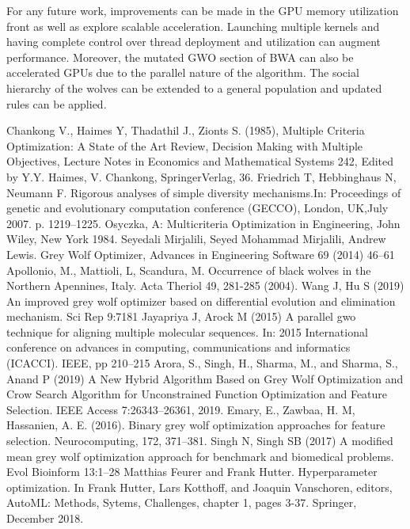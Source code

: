 \documentclass[conference]{IEEEtran}
\begin{document}
For any future work, improvements can be made in the GPU memory utilization front as well as explore scalable acceleration. Launching multiple kernels and having complete control over thread deployment and utilization can augment performance. Moreover, the mutated GWO section of BWA can also be accelerated GPUs due to the parallel nature of the algorithm. The social hierarchy of the wolves can be extended to a general population and updated rules can be applied. 

% 
\begin{thebibliography}{00}
 Chankong V., Haimes Y, Thadathil J., Zionts S. (1985), Multiple Criteria Optimization: A State of the Art Review, Decision Making with Multiple Objectives, Lecture Notes in Economics and Mathematical Systems 242, Edited by Y.Y. Haimes, V. Chankong, SpringerVerlag, 36.
Friedrich T, Hebbinghaus N, Neumann F. Rigorous analyses of simple diversity mechanisms.In: Proceedings of genetic and evolutionary computation conference (GECCO), London, UK,July 2007. p. 1219–1225.
Osyczka, A: Multicriteria Optimization in Engineering, John Wiley, New York 1984.
Seyedali Mirjalili, Seyed Mohammad Mirjalili, Andrew Lewis. Grey Wolf Optimizer, Advances in Engineering Software 69 (2014) 46–61
 Apollonio, M., Mattioli, L, Scandura, M. Occurrence of black wolves in the Northern Apennines, Italy. Acta Theriol 49, 281-285 (2004).
Wang J, Hu S (2019) An improved grey wolf optimizer based on differential evolution and elimination mechanism. Sci Rep 9:7181
Jayapriya J, Arock M (2015) A parallel gwo technique for aligning multiple molecular sequences. In: 2015 International conference on advances in computing, communications and informatics (ICACCI). IEEE, pp 210–215
Arora, S., Singh, H., Sharma, M., and Sharma, S., Anand P (2019) A New Hybrid Algorithm Based on Grey Wolf Optimization and Crow Search Algorithm for Unconstrained Function Optimization and Feature Selection. IEEE Access 7:26343–26361, 2019.
Emary, E., Zawbaa, H. M, Hassanien, A. E. (2016). Binary grey wolf optimization approaches for feature selection. Neurocomputing, 172, 371–381.
Singh N, Singh SB (2017) A modified mean grey wolf optimization approach for benchmark and biomedical problems. Evol Bioinform 13:1–28
Matthias Feurer and Frank Hutter. Hyperparameter optimization. In Frank Hutter, Lars Kotthoff, and Joaquin Vanschoren, editors, AutoML: Methods, Sytems, Challenges, chapter 1, pages 3-37. Springer, December 2018.

\end{thebibliography}
\end{document}
